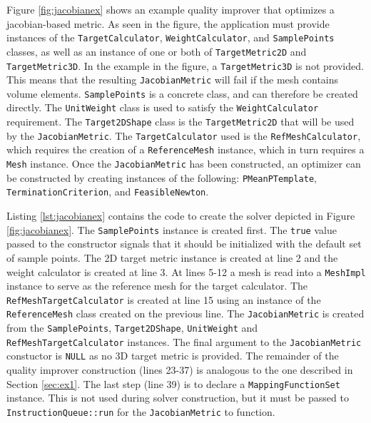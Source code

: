 \documentclass{article}
\begin{document}
Figure \ref{fig:jacobianex} shows an example quality improver that optimizes a jacobian-based metric.  As seen in the figure, the application must provide instances of the \texttt{TargetCalculator}, \texttt{WeightCalculator}, and \texttt{SamplePoints} classes, as well as an instance of one or both of \texttt{TargetMetric2D} and \texttt{TargetMetric3D}.  In the example in the figure, a \texttt{TargetMetric3D} is not provided.  This means that the resulting \texttt{JacobianMetric} will fail if the mesh contains volume elements.  \texttt{SamplePoints} is a concrete class, and can therefore be created directly.  The \texttt{UnitWeight} class is used to satisfy the \texttt{WeightCalculator} requirement.  The \texttt{Target2DShape} class is the \texttt{TargetMetric2D} that will be used by the \texttt{JacobianMetric}.  The \texttt{TargetCalculator} used is the \texttt{RefMeshCalculator}, which requires the creation of a \texttt{ReferenceMesh} instance, which in turn requires a \texttt{Mesh} instance.  Once the \texttt{JacobianMetric} has been constructed, an optimizer can be constructed by creating instances of the following: \texttt{PMeanPTemplate}, \texttt{TerminationCriterion}, and \texttt{FeasibleNewton}.

Listing \ref{lst:jacobianex} contains the code to create the solver depicted in Figure \ref{fig:jacobianex}.  The \texttt{SamplePoints} instance is created first.  The \texttt{true} value passed to the constructor signals that it should be initialized with the default set of sample points.  The 2D target metric instance is created at line 2 and the weight calculator is created at line 3.  At lines 5-12 a mesh is read into a \texttt{MeshImpl} instance to serve as the reference mesh for the target calculator.  The \texttt{RefMeshTargetCalculator} is created at line 15 using an instance of the \texttt{ReferenceMesh} class created on the previous line.  The \texttt{JacobianMetric} is created from the \texttt{SamplePoints}, \texttt{Target2DShape}, \texttt{UnitWeight} and \texttt{RefMeshTargetCalculator} instances.  The final argument to the \texttt{JacobianMetric} constuctor is \texttt{NULL} as no 3D target metric is provided.  The remainder of the quality improver construction (lines 23-37) is analogous to the one described in Section \ref{sec:ex1}.  The last step (line 39) is to declare a \texttt{MappingFunctionSet} instance.  This is not used during solver construction, but it must be passed to \texttt{InstructionQueue::run} for the \texttt{JacobianMetric} to function.
\end{document}

